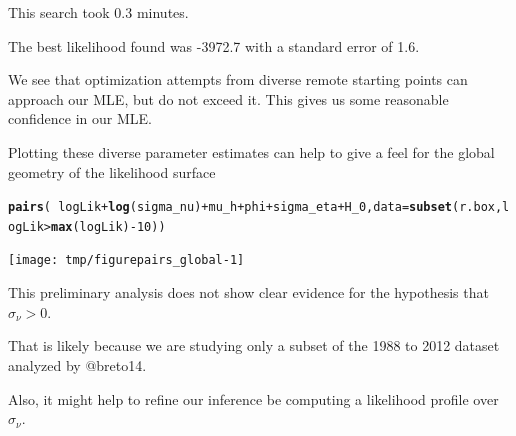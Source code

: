 \documentclass{beamer}\usepackage[]{graphicx}\usepackage[]{color}
\makeatletter
\newcommand{\hlnum}[1]{\textcolor[rgb]{0.686,0.059,0.569}{#1}}%
\newcommand{\hlopt}[1]{\textcolor[rgb]{0,0,0}{#1}}%
\newcommand{\hlstd}[1]{\textcolor[rgb]{0.345,0.345,0.345}{#1}}%
\newcommand{\hlkwc}[1]{\textcolor[rgb]{0.333,0.667,0.333}{#1}}%
\newcommand{\hlkwd}[1]{\textcolor[rgb]{0.737,0.353,0.396}{\textbf{#1}}}%
\newenvironment{kframe}{%
 \def\at@end@of@kframe{}%
 \ifinner\ifhmode%
  \def\at@end@of@kframe{\end{minipage}}%
  \begin{minipage}{\columnwidth}%
 \fi\fi%
 \def\FrameCommand##1{\hskip\@totalleftmargin \hskip-\fboxsep
 \colorbox{shadecolor}{##1}\hskip-\fboxsep
     \hskip-\linewidth \hskip-\@totalleftmargin \hskip\columnwidth}%
 \MakeFramed {\advance\hsize-\width
   \@totalleftmargin\z@ \linewidth\hsize
   \@setminipage}}%
 {\par\unskip\endMakeFramed%
 \at@end@of@kframe}
\newenvironment{knitrout}{}{} %
\makeatother
\begin{document}
\begin{frame}[fragile]

\bi

\item This search took  0.3 minutes. 

\item The best likelihood found was -3972.7 with a standard error of 1.6. 

\item We see that optimization attempts from diverse remote starting points can approach our MLE, but do not exceed it. This gives us some reasonable confidence in our MLE. 

\item Plotting these diverse parameter estimates can help to give a feel for the global geometry of the likelihood surface 

\ei

\end{frame}

\begin{frame}[fragile]

\begin{knitrout}\small
{}\color{fgcolor}\begin{kframe}
\begin{alltt}
\hlkwd{pairs}\hlstd{(}\hlopt{~}\hlstd{logLik}\hlopt{+}\hlkwd{log}\hlstd{(sigma_nu)}\hlopt{+}\hlstd{mu_h}\hlopt{+}\hlstd{phi}\hlopt{+}\hlstd{sigma_eta}\hlopt{+}\hlstd{H_0,}\hlkwc{data}\hlstd{=}\hlkwd{subset}\hlstd{(r.box,logLik}\hlopt{>}\hlkwd{max}\hlstd{(logLik)}\hlopt{-}\hlnum{10}\hlstd{))}
\end{alltt}
\end{kframe}

{\centering \texttt{[image: tmp/figurepairs\_global-1]} 

}



\end{knitrout}

\end{frame}

\begin{frame}[fragile]

\bi

\item This preliminary analysis does not show clear evidence for the hypothesis that $\sigma_\nu > 0$. 

\item That is likely because we are studying only a subset of the 1988 to 2012 dataset analyzed by @breto14. 

\item Also, it might help to refine our inference be computing a likelihood profile over $\sigma_\nu$.

\ei

\end{frame}
\end{document}
